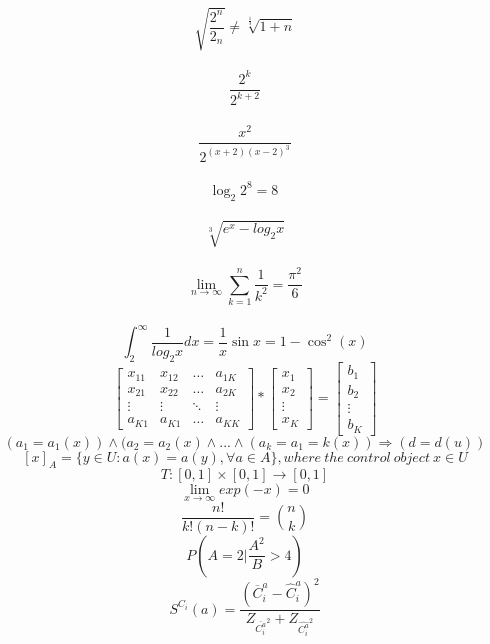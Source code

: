 \documentclass[12pt, letterpaper, titlepage]{article}
\begin{document}
$$ \sqrt{ \frac{2^{n}}{2_n}} \neq \sqrt[\frac{1}{3}]{1+n} $$\\
$$ \frac{2^{k}}{2^{k+2}} $$\\
$$ \frac{x^{2}}{2^{(x+2)(x-2)^3}} $$\\
$$ \log_{2}2^{8}=8 \ $$\\ 
$$ \sqrt[3]{e^{x}-log_{2}x} $$\\
$$ \lim_{n\rightarrow\infty}\sum_{k=1}^{n} \frac{1}{k^2}= \frac{\pi^{2}}{6}$$\\
$$ \int_{2}^{\infty}\frac{1}{log_{2}x}dx=\frac{1}{x}\sin{x}=1-\cos^{2}(x)$$
$$\mathbf{}
\left[ \begin{array}{cccc}
x_{11} & x_{12} & \ldots & a_{1K} \\ 
x_{21} & x_{22} & \ldots & a_{2K} \\
\vdots & \vdots & \ddots & \vdots \\
a_{K1} & a_{K1} & \ldots & a_{KK}
\end{array} \right]
*
\mathbf{}
\left[ \begin{array}{c}
x_{1} \\ 
x_{2} \\
\vdots\\
x_{K} 
\end{array} \right]
=
\mathbf{}
\left[ \begin{array}{c}
b_{1} \\ 
b_{2} \\
\vdots\\
b_{K} 
\end{array} \right]$$
$$(a_1=a_1(x)) \wedge (a_2=a_2(x) \wedge ... \wedge (a_k=a_1=k(x))\Rightarrow (d=d(u))$$
$$[x]_A=\{y\in U:a(x)=a(y),\forall a \in A\}, where \ the \ control \ object \ x \in U$$
$$T:[0,1]\times[0,1]\rightarrow[0,1]$$
$$\lim_{x\rightarrow\infty} exp(-x)=0 $$
$$\frac{n!}{k!(n-k)!} =  {n \choose k} $$
$$P\left(A=2\bigg|\frac{A^2}{B}>4\right)$$
$$S^{C_i}(a)=\frac{(\overline{C}^{a}_i-\hat{C}^a_i)^2}{Z_{\bar{C^a_i}^2}+Z_{\hat{C^a_i}^2}}$$
\end{document}
